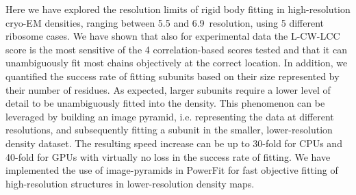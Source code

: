 
Here we have explored the resolution limits of rigid body fitting in
high-resolution cryo-EM densities, ranging between 5.5 and 6.9\Angstrom\ resolution,
using 5 different ribosome cases. We have shown that also for experimental data
the L-CW-LCC score is the most sensitive of the 4 correlation-based scores
tested and that it can unambiguously fit most chains objectively at the correct
location. In addition, we quantified the success rate of fitting subunits based
on their size represented by their number of residues. As expected, larger
subunits require a lower level of detail to be unambiguously fitted into the
density. This phenomenon can be leveraged by building an image pyramid, i.e.
representing the data at different resolutions, and subsequently fitting a
subunit in the smaller, lower-resolution density dataset. The resulting speed
increase can be up to 30-fold for CPUs and 40-fold for GPUs with virtually no
loss in the success rate of fitting. We have implemented the use of
image-pyramids in PowerFit for fast objective fitting of high-resolution
structures in lower-resolution density maps. 


